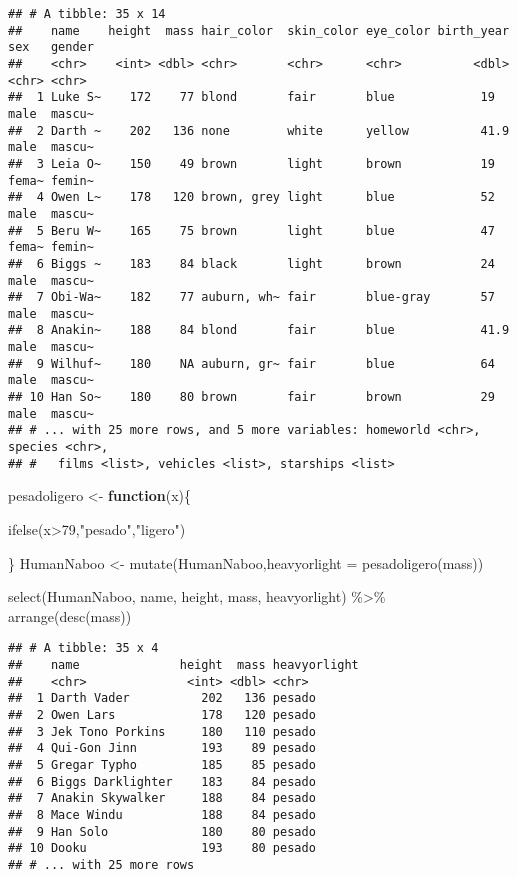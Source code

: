 \documentclass[
]{book}
\newenvironment{Shaded}{\begin{snugshade}}{\end{snugshade}}
\newcommand{\AttributeTok}[1]{\textcolor[rgb]{0.77,0.63,0.00}{#1}}
\newcommand{\ControlFlowTok}[1]{\textcolor[rgb]{0.13,0.29,0.53}{\textbf{#1}}}
\newcommand{\DecValTok}[1]{\textcolor[rgb]{0.00,0.00,0.81}{#1}}
\newcommand{\FunctionTok}[1]{\textcolor[rgb]{0.00,0.00,0.00}{#1}}
\newcommand{\NormalTok}[1]{#1}
\newcommand{\OtherTok}[1]{\textcolor[rgb]{0.56,0.35,0.01}{#1}}
\newcommand{\SpecialCharTok}[1]{\textcolor[rgb]{0.00,0.00,0.00}{#1}}
\newcommand{\StringTok}[1]{\textcolor[rgb]{0.31,0.60,0.02}{#1}}
\begin{document}
\begin{verbatim}
## # A tibble: 35 x 14
##    name    height  mass hair_color  skin_color eye_color birth_year sex   gender
##    <chr>    <int> <dbl> <chr>       <chr>      <chr>          <dbl> <chr> <chr> 
##  1 Luke S~    172    77 blond       fair       blue            19   male  mascu~
##  2 Darth ~    202   136 none        white      yellow          41.9 male  mascu~
##  3 Leia O~    150    49 brown       light      brown           19   fema~ femin~
##  4 Owen L~    178   120 brown, grey light      blue            52   male  mascu~
##  5 Beru W~    165    75 brown       light      blue            47   fema~ femin~
##  6 Biggs ~    183    84 black       light      brown           24   male  mascu~
##  7 Obi-Wa~    182    77 auburn, wh~ fair       blue-gray       57   male  mascu~
##  8 Anakin~    188    84 blond       fair       blue            41.9 male  mascu~
##  9 Wilhuf~    180    NA auburn, gr~ fair       blue            64   male  mascu~
## 10 Han So~    180    80 brown       fair       brown           29   male  mascu~
## # ... with 25 more rows, and 5 more variables: homeworld <chr>, species <chr>,
## #   films <list>, vehicles <list>, starships <list>
\end{verbatim}

\begin{Shaded}
\begin{Highlighting}[]
\NormalTok{pesadoligero }\OtherTok{\textless{}{-}} \ControlFlowTok{function}\NormalTok{(x)\{}
  
  \FunctionTok{ifelse}\NormalTok{(x}\SpecialCharTok{\textgreater{}}\DecValTok{79}\NormalTok{,}\StringTok{"pesado"}\NormalTok{,}\StringTok{"ligero"}\NormalTok{)}
  
\NormalTok{\}}
\NormalTok{HumanNaboo }\OtherTok{\textless{}{-}} \FunctionTok{mutate}\NormalTok{(HumanNaboo,}\AttributeTok{heavyorlight =} \FunctionTok{pesadoligero}\NormalTok{(mass))}

\FunctionTok{select}\NormalTok{(HumanNaboo, name, height, mass, heavyorlight) }\SpecialCharTok{\%\textgreater{}\%} \FunctionTok{arrange}\NormalTok{(}\FunctionTok{desc}\NormalTok{(mass))}
\end{Highlighting}
\end{Shaded}

\begin{verbatim}
## # A tibble: 35 x 4
##    name              height  mass heavyorlight
##    <chr>              <int> <dbl> <chr>       
##  1 Darth Vader          202   136 pesado      
##  2 Owen Lars            178   120 pesado      
##  3 Jek Tono Porkins     180   110 pesado      
##  4 Qui-Gon Jinn         193    89 pesado      
##  5 Gregar Typho         185    85 pesado      
##  6 Biggs Darklighter    183    84 pesado      
##  7 Anakin Skywalker     188    84 pesado      
##  8 Mace Windu           188    84 pesado      
##  9 Han Solo             180    80 pesado      
## 10 Dooku                193    80 pesado      
## # ... with 25 more rows
\end{verbatim}
\end{document}
